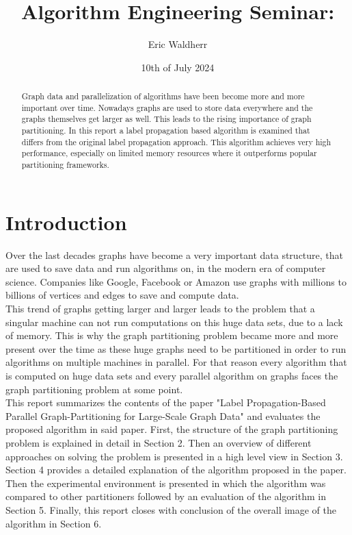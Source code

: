 \documentclass[acmsmall,nonacm,screen,review]{acmart}
\title{Algorithm Engineering Seminar: }
\author{Eric Waldherr}
\affiliation{%
  \institution{Heidelberg University}
  \streetaddress{Im Neuenheimer Feld 205}
  \city{Heidelberg}
  \state{Baden-Württemberg}
  \country{Germany}
  \postcode{69120}
}
\date{10th of July 2024}
\begin{document}
\begin{abstract}
Graph data and parallelization of algorithms have been become more and more important over time. Nowadays graphs are used to store data everywhere and the graphs themselves get larger as well. This leads to the rising importance of graph partitioning. In this report a label propagation based algorithm is examined that differs from the original label propagation approach. This algorithm achieves very high performance, especially on limited memory resources where it outperforms popular partitioning frameworks.
\end{abstract}
\maketitle

\section{Introduction}
Over the last decades graphs have become a very important data structure, that are used to save data
and run algorithms on, in the modern era of computer science. Companies like Google, Facebook or Amazon use graphs with millions to billions of vertices and edges to save and compute data.\\ 
This trend of graphs getting larger and larger leads to the problem that a singular machine can not run computations on this huge data sets, due to a lack of memory. This is why the graph partitioning problem became more and more present over the time as these huge graphs need to be partitioned in order to run algorithms on multiple machines in parallel. For that reason every algorithm that is computed on huge data sets and every parallel algorithm on graphs faces the graph partitioning problem at some point.\\ 
This report summarizes the contents of the paper "Label Propagation-Based Parallel Graph-Partitioning for Large-Scale Graph Data" \cite{Main} and evaluates the proposed algorithm in said paper. First, the structure of the graph partitioning problem is explained in detail in Section 2. Then an overview of different approaches on solving the problem is presented in a high level view in Section 3. Section 4 provides a detailed explanation of the algorithm proposed in the paper. Then the experimental environment is presented in which the algorithm was compared to other partitioners followed by an evaluation of the algorithm in Section 5. Finally, this report closes with conclusion of the overall image of the algorithm in Section 6.
\end{document}
